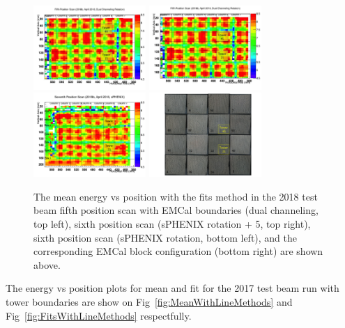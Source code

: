 \documentclass[hidelinks,11pt]{article}
\numberwithin{figure}{section}
\numberwithin{table}{section}
\begin{document}
\begin{figure}[hbtp]
\begin{center}
\includegraphics[width=0.38\textwidth]{Plots/BlockConfig/Inter20185thScanLabeled.png}
\includegraphics[width=0.38\textwidth]{Plots/BlockConfig/Inter20186thScanLabeled.png}
\includegraphics[width=0.38\textwidth]{Plots/BlockConfig/Inter20187thScanLabeled.png}
\includegraphics[width=0.38\textwidth]{Plots/BlockConfig/BlockConfig2018.png}
\caption{The mean energy vs position with the fits method in the 2018 test beam fifth position scan with EMCal boundaries (dual channeling, top left), sixth position scan (sPHENIX rotation + 5, top right), sixth position scan (sPHENIX rotation, bottom left), and the corresponding EMCal block configuration (bottom right) are shown above.}
\label{fig:BlockEMCAL}
\end{center}
\end{figure} 

The energy vs position plots for mean and fit for the  2017 test beam run with tower boundaries are show on Fig~\ref{fig:MeanWithLineMethods} and Fig~\ref{fig:FitsWithLineMethods} respectfully. 
\end{document}

